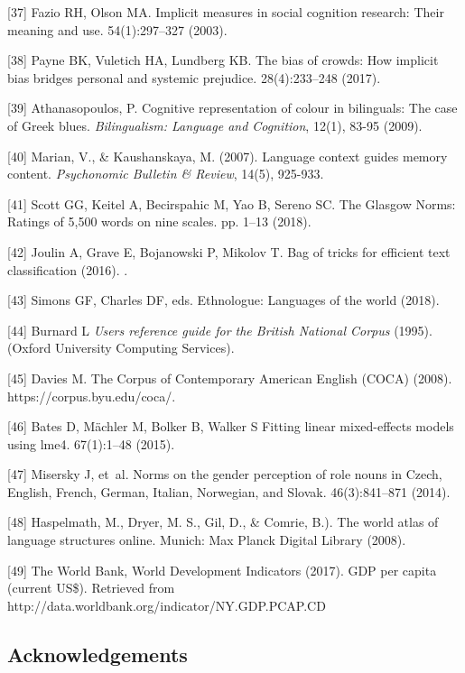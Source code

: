 \documentclass[11pt]{wlscirep}
\begin{document}
[37] Fazio RH, Olson MA. Implicit measures in social cognition research: Their
  meaning and use.
 54(1):297--327 (2003).

[38] Payne BK, Vuletich HA, Lundberg KB. The bias of crowds: How implicit bias
  bridges personal and systemic prejudice.
 28(4):233--248  (2017).

[39] Athanasopoulos, P. Cognitive representation of colour in bilinguals: The case of Greek blues. {\it Bilingualism: Language and Cognition}, 12(1), 83-95 (2009).

[40] Marian, V., \& Kaushanskaya, M. (2007). Language context guides memory content. {\it Psychonomic Bulletin \& Review}, 14(5), 925-933.

[41] Scott GG, Keitel A, Becirspahic M, Yao B, Sereno SC. The {G}lasgow
  {N}orms: Ratings of 5,500 words on nine scales.
 pp. 1--13 (2018).

[42] Joulin A, Grave E, Bojanowski P, Mikolov T. Bag of tricks for efficient
  text classification (2016).
.

[43] Simons GF, Charles DF, eds. Ethnologue: Languages of the world (2018).

[44] Burnard L  {\em Users reference guide for the British National Corpus} (1995).
\newblock (Oxford University Computing Services).

[45] Davies M. The {C}orpus of {C}ontemporary {A}merican {E}nglish ({COCA}) (2008).
\newblock https://corpus.byu.edu/coca/.

[46] Bates D, M{\"a}chler M, Bolker B, Walker S  Fitting linear mixed-effects
  models using {lme4}.
 67(1):1--48 (2015).

[47] Misersky J, et~al.  Norms on the gender perception of role nouns in
  {C}zech, {E}nglish, {F}rench, {G}erman, {I}talian, {N}orwegian, and {S}lovak.
 46(3):841--871 (2014).

[48] Haspelmath, M., Dryer, M. S., Gil, D., \& Comrie, B.). The world atlas of language structures online. Munich: Max Planck Digital Library (2008).

[49] The World Bank, World Development Indicators (2017). GDP per capita (current US\$). Retrieved from http://data.worldbank.org/indicator/NY.GDP.PCAP.CD


\subsection*{Acknowledgements}
\end{document}
